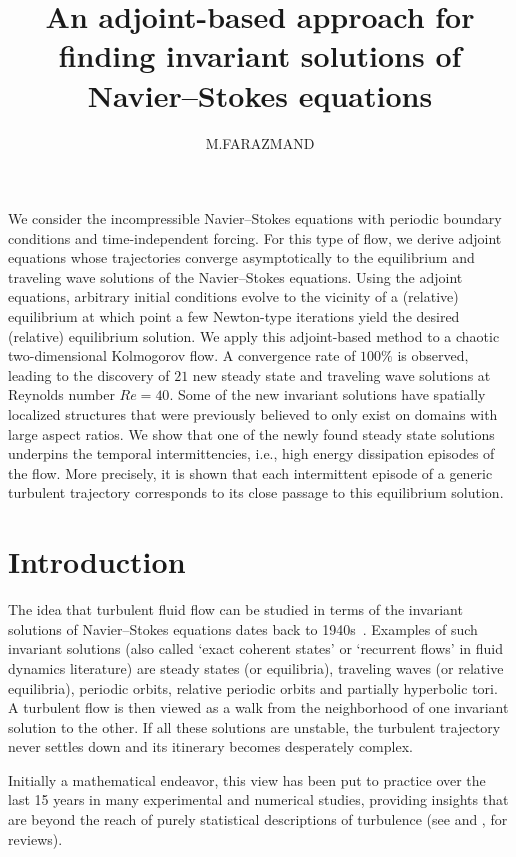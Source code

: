 \documentclass{jfm}
\title[Invariant solutions of the Navier--Stokes equation]
      {An adjoint-based approach for finding invariant
       solutions of Navier--Stokes equations}
\author[
M. FARAZMAND
        ]
{
M.\ns F\ls A\ls R\ls A\ls Z\ls M\ls A\ls N\ls D
}
\affiliation{
 Center for Nonlinear Science,
 School of Physics,
 Georgia Institute of Technology,
 Atlanta, GA  30332, USA
}
\begin{document}
\maketitle

We consider the incompressible Navier--Stokes equations with periodic boundary conditions and
time-independent forcing. For this type of flow, we derive adjoint equations whose
trajectories
converge asymptotically to the equilibrium and traveling wave solutions
of the Navier--Stokes equations. Using the adjoint equations,
arbitrary initial conditions evolve
to the vicinity of a (relative) equilibrium at which point a few
Newton-type iterations yield the desired (relative) equilibrium solution. We apply this
adjoint-based method
to a chaotic two-dimensional Kolmogorov flow. A convergence rate of $100\%$ is observed,
leading to the discovery
of $21$ new steady state and traveling wave solutions at Reynolds number $Re=40$.
Some of the new invariant solutions have spatially localized structures
that were previously believed to only exist on domains with large aspect ratios.
We show that one of the newly found
steady state solutions underpins the temporal intermittencies, i.e., high energy
dissipation episodes
of the flow. More precisely, it is shown that each intermittent episode of a generic turbulent
trajectory
corresponds to its close passage to this equilibrium solution.

\section{Introduction}\label{s:intro}
The idea that turbulent fluid flow can be studied in terms of
the invariant solutions of Navier--Stokes equations dates back to
1940s~\citep{hopf48}. Examples of such invariant solutions (also called
`exact coherent states' or `recurrent flows' in fluid dynamics
literature) are
steady states (or equilibria), traveling waves
(or relative equilibria), periodic orbits, relative periodic orbits and
partially hyperbolic tori.
A turbulent flow is then viewed as a walk from the neighborhood of
one invariant solution to the other. If all these solutions are unstable,
the turbulent trajectory never settles down and its itinerary becomes
desperately complex.

Initially a mathematical endeavor, this view has been put to practice over the last
15 years in many experimental and numerical studies, providing insights
that are beyond the reach of purely statistical descriptions of turbulence
(see  and , for reviews). %
\end{document}
